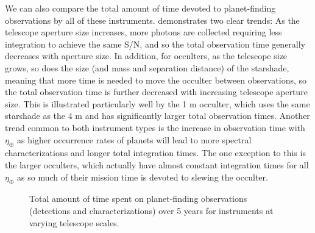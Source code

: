  We can also compare the total amount of time devoted to planet-finding observations by all of these instruments.  demonstrates two clear trends: As the telescope aperture size increases, more photons are collected requiring less integration to achieve the same S/N, and so the total observation time generally decreases with aperture size.  In addition, for occulters, as the telescope size grows, so does the size (and mass and separation distance) of the starshade, meaning that more time is needed to move the occulter between observations, so the total observation time is further decreased with increasing telescope aperture size.  This is illustrated particularly well by the 1 m occulter, which uses the same starshade as the 4 m and has significantly larger total observation times.  Another trend common to both instrument types is the increase in observation time with $\eta_\oplus$ as higher occurrence rates of planets will lead to more spectral characterizations and longer total integration times.  The one exception to this is the larger occulters, which actually have almost constant integration times for all $\eta_\oplus$ as so much of their mission time is devoted to slewing the occulter.
  \begin{figure}[ht]
 \centering
{}
\caption[Total observation times]{ \label{fig:obsTimes} Total amount of time spent on planet-finding observations (detections and characterizations) over 5 years for instruments at varying telescope scales.}
 \end{figure}
 
